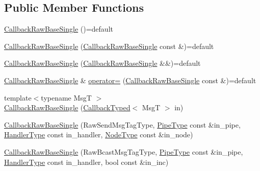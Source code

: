 \subsection*{Public Member Functions}
\begin{DoxyCompactItemize}
\item 
\hyperlink{structvt_1_1pipe_1_1callback_1_1cbunion_1_1_callback_raw_base_single_a54c1e88b04174314284479d39f31c46a}{Callback\+Raw\+Base\+Single} ()=default
\item 
\hyperlink{structvt_1_1pipe_1_1callback_1_1cbunion_1_1_callback_raw_base_single_a80569ca80e358052d839a15a0bcd287c}{Callback\+Raw\+Base\+Single} (\hyperlink{structvt_1_1pipe_1_1callback_1_1cbunion_1_1_callback_raw_base_single}{Callback\+Raw\+Base\+Single} const \&)=default
\item 
\hyperlink{structvt_1_1pipe_1_1callback_1_1cbunion_1_1_callback_raw_base_single_a8b2961b281dbf416f6d2eec2b7c11192}{Callback\+Raw\+Base\+Single} (\hyperlink{structvt_1_1pipe_1_1callback_1_1cbunion_1_1_callback_raw_base_single}{Callback\+Raw\+Base\+Single} \&\&)=default
\item 
\hyperlink{structvt_1_1pipe_1_1callback_1_1cbunion_1_1_callback_raw_base_single}{Callback\+Raw\+Base\+Single} \& \hyperlink{structvt_1_1pipe_1_1callback_1_1cbunion_1_1_callback_raw_base_single_a7037c612d471371061a32dc7b1bdea3a}{operator=} (\hyperlink{structvt_1_1pipe_1_1callback_1_1cbunion_1_1_callback_raw_base_single}{Callback\+Raw\+Base\+Single} const \&)=default
\item 
{\footnotesize template$<$typename MsgT $>$ }\\\hyperlink{structvt_1_1pipe_1_1callback_1_1cbunion_1_1_callback_raw_base_single_a00a840a889e6ca98c250d3f663972ade}{Callback\+Raw\+Base\+Single} (\hyperlink{structvt_1_1pipe_1_1callback_1_1cbunion_1_1_callback_typed}{Callback\+Typed}$<$ MsgT $>$ in)
\item 
\hyperlink{structvt_1_1pipe_1_1callback_1_1cbunion_1_1_callback_raw_base_single_a3d37003d95cb6fe474caa7f3053b9460}{Callback\+Raw\+Base\+Single} (Raw\+Send\+Msg\+Tag\+Type, \hyperlink{namespacevt_ac9852acda74d1896f48f406cd72c7bd3}{Pipe\+Type} const \&in\+\_\+pipe, \hyperlink{namespacevt_af64846b57dfcaf104da3ef6967917573}{Handler\+Type} const in\+\_\+handler, \hyperlink{namespacevt_a866da9d0efc19c0a1ce79e9e492f47e2}{Node\+Type} const \&in\+\_\+node)
\item 
\hyperlink{structvt_1_1pipe_1_1callback_1_1cbunion_1_1_callback_raw_base_single_a885cfc8040f977a178c80275d52b4439}{Callback\+Raw\+Base\+Single} (Raw\+Bcast\+Msg\+Tag\+Type, \hyperlink{namespacevt_ac9852acda74d1896f48f406cd72c7bd3}{Pipe\+Type} const \&in\+\_\+pipe, \hyperlink{namespacevt_af64846b57dfcaf104da3ef6967917573}{Handler\+Type} const in\+\_\+handler, bool const \&in\+\_\+inc)

\end{DoxyCompactItemize}
